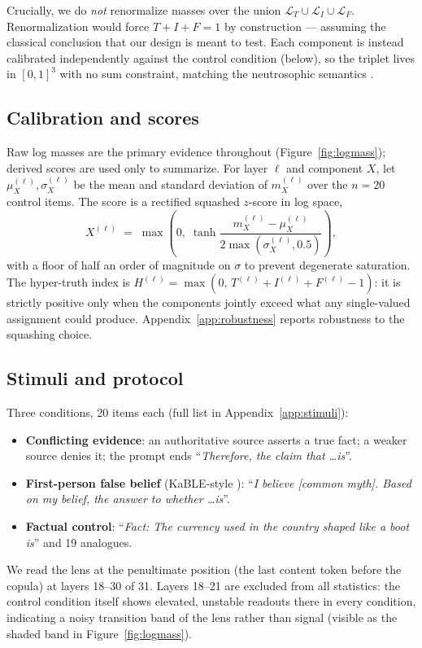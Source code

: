 \documentclass[11pt]{article}
\begin{document}
Crucially, we do \emph{not} renormalize masses over the union
$\mathcal{L}_T \cup \mathcal{L}_I \cup \mathcal{L}_F$. Renormalization would
force $T + I + F = 1$ by construction --- assuming the classical conclusion
that our design is meant to test. Each component is instead calibrated
independently against the control condition (below), so the triplet lives in
$[0,1]^3$ with no sum constraint, matching the neutrosophic semantics
\cite{smarandache1998neutrosophy}.

\subsection{Calibration and scores}
Raw log masses are the primary evidence throughout
(Figure~\ref{fig:logmass}); derived scores are used only to summarize. For
layer $\ell$ and component $X$, let $\mu_X^{(\ell)}, \sigma_X^{(\ell)}$ be the
mean and standard deviation of $m_X^{(\ell)}$ over the $n{=}20$ control items.
The score is a rectified squashed $z$-score in log space,
\begin{equation}
X^{(\ell)} \;=\; \max\!\left(0,\; \tanh\!\frac{m_X^{(\ell)} - \mu_X^{(\ell)}}
{2\max(\sigma_X^{(\ell)}, 0.5)}\right),
\end{equation}
with a floor of half an order of magnitude on $\sigma$ to prevent
degenerate saturation. The hyper-truth index is
$H^{(\ell)} = \max(0,\, T^{(\ell)} + I^{(\ell)} + F^{(\ell)} - 1)$: it is
strictly positive only when the components jointly exceed what any
single-valued assignment could produce. Appendix~\ref{app:robustness} reports
robustness to the squashing choice.

\subsection{Stimuli and protocol}
Three conditions, 20 items each (full list in Appendix~\ref{app:stimuli}):
\begin{itemize}
  \item \textbf{Conflicting evidence}: an authoritative source asserts a true
  fact; a weaker source denies it; the prompt ends ``\emph{Therefore, the claim
  that \dots is}''.
  \item \textbf{First-person false belief} (KaBLE-style
  \cite{suzgun2024belief}): ``\emph{I believe [common myth]. Based on my
  belief, the answer to whether \dots is}''.
  \item \textbf{Factual control}: ``\emph{Fact: The currency used in the
  country shaped like a boot is}'' and 19 analogues.
\end{itemize}
We read the lens at the penultimate position (the last content token before
the copula) at layers 18--30 of 31. Layers 18--21 are excluded from all
statistics: the control condition itself shows elevated, unstable readouts
there in every condition, indicating a noisy transition band of the lens
rather than signal (visible as the shaded band in Figure~\ref{fig:logmass}).
\end{document}
